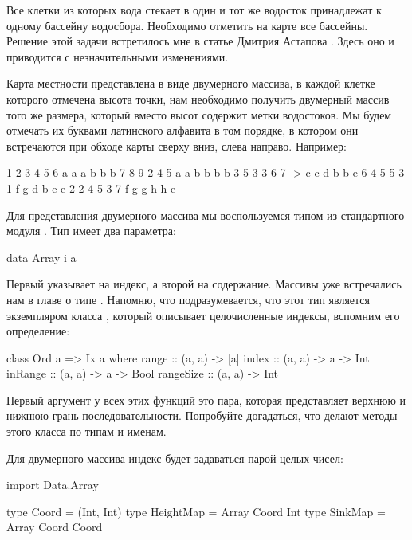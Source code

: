 Все клетки из которых вода стекает в один и тот же
водосток принадлежат к одному бассейну водосбора. 
Необходимо отметить на карте все бассейны. Решение
этой задачи встретилось мне в статье Дмитрия Астапова
.
Здесь оно и приводится с незначительными изменениями.

Карта местности представлена в виде двумерного массива,
в каждой клетке которого отмечена высота точки,
нам необходимо получить двумерный массив того же размера,
который вместо высот содержит метки водостоков. Мы будем 
отмечать их буквами латинского алфавита в том порядке,
в котором они встречаются при обходе карты сверху вниз,
слева направо. Например:

\begin{code}
1 2 3 4 5 6       a a a b b b
7 8 9 2 4 5       a a b b b b
3 5 3 3 6 7   ->  c c d b b e 
6 4 5 5 3 1       f g d b e e
2 2 4 5 3 7       f g g h h e
\end{code}

Для представления двумерного массива мы воспользуемся
типом  из стандартного модуля .
Тип  имеет два параметра:

\begin{code}
data Array i a
\end{code}

Первый указывает на индекс, а второй на содержание. 
Массивы уже встречались нам в главе о типе .
Напомню, что подразумевается, что этот тип является экземпляром
класса , который описывает целочисленные индексы,
вспомним его определение:

\begin{code}
class Ord a => Ix a where
    range       :: (a, a) -> [a]
    index       :: (a, a) -> a -> Int
    inRange     :: (a, a) -> a -> Bool
    rangeSize   :: (a, a) -> Int
\end{code}

Первый аргумент у всех этих функций это пара, которая 
представляет верхнюю и нижнюю грань последовательности. 
Попробуйте догадаться, что делают методы этого класса 
по типам и именам.

Для двумерного массива индекс будет задаваться парой целых
чисел:

\begin{code}
import Data.Array

type Coord = (Int, Int)
type HeightMap = Array Coord Int
type SinkMap   = Array Coord Coord
\end{code}

